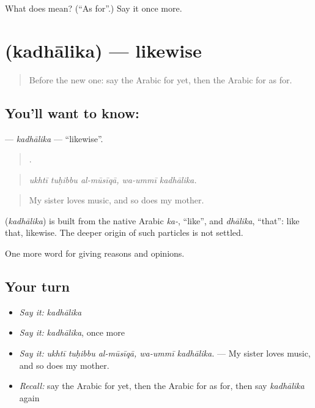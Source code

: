 \begin{tcolorbox}[breakable,colback=teal!4,colframe=teal!35!black,title={Before you move on}]
What does  mean? (\textquotedblleft{}As for\textquotedblright{}.) Say it once more.
\end{tcolorbox}
\section[\texorpdfstring{\ar{كذلك} (kadhālika)}{كذلك (kadhālika)}]{ (kadhālika) — likewise}

\label{lesson:AR-C375-kadhalika}



\begin{quote}
Before the new one: say the Arabic for yet, then the Arabic for as for.
\end{quote}

\subsection*{You'll want to know: }
\textbf{} — \emph{kadhālika} — \textquotedblleft{}likewise\textquotedblright{}.

\begin{quote}
    .
\end{quote}

\begin{quote}
\emph{ukhtī tuḥibbu al-mūsīqā, wa-ummī kadhālika.}
\end{quote}

\begin{quote}
My sister loves music, and so does my mother.
\end{quote}

\begin{cousinweb}
\textbf{} (\emph{kadhālika}) is built from the native Arabic \emph{ka-}, \textquotedblleft{}like\textquotedblright{}, and \emph{dhālika}, \textquotedblleft{}that\textquotedblright{}: like that, likewise. The deeper origin of such particles is not settled.
\end{cousinweb}

\begin{grammarlens}[title={What you've built}]
One more word for giving reasons and opinions.
\end{grammarlens}

\subsection*{Your turn}
\begin{itemize}
\raggedright
  \item \emph{Say it:} \emph{kadhālika}
  \item \emph{Say it:} \emph{kadhālika}, once more
  \item \emph{Say it:} \emph{ukhtī tuḥibbu al-mūsīqā, wa-ummī kadhālika.} — My sister loves music, and so does my mother.
  \item \emph{Recall:} say the Arabic for yet, then the Arabic for as for, then say \emph{kadhālika} again
\end{itemize}

